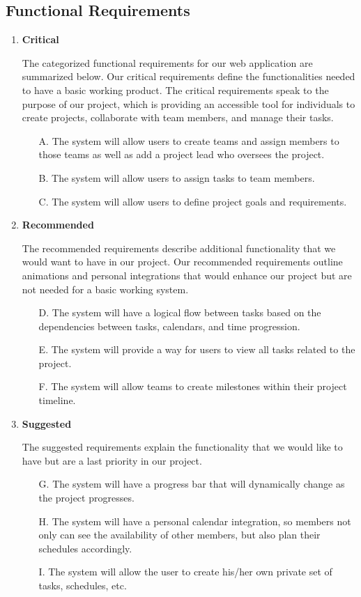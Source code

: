 \pagebreak

\subsection{Functional Requirements}
\begin{enumerate}
\item \textbf{Critical}
\par The categorized functional requirements for our web application are summarized below. Our critical requirements define the functionalities needed to have a basic working product. The critical requirements speak to the purpose of our project, which is providing an accessible tool for individuals to create projects, collaborate with team members, and manage their tasks.
	\begin{enumerate}
	\item[A.] The system will allow users to create teams and assign members to those teams as well as add a project lead who oversees the project. 
	\item[B.] The system will allow users to assign tasks to team members.
	\item[C.] The system will allow users to define project goals and requirements.

	\end{enumerate}
\item \textbf{Recommended}
\par The recommended requirements describe additional functionality that we would want to have in our project. Our recommended requirements outline animations and personal integrations that would enhance our project but are not needed for a basic working system. 
	\begin{enumerate}
	\item[D.] The system will have a logical flow between tasks based on the dependencies between tasks, calendars, and time progression. 
	\item[E.] The system will provide a way for users to view all tasks related to the project.
	\item[F.] The system will allow teams to create milestones within their project timeline.
	\end{enumerate}
\item \textbf{Suggested}
\par The suggested requirements explain the functionality that we would like to have but are a last priority in our project. 
	\begin{enumerate}
	\item[G.] The system will have a progress bar that will dynamically change as the project progresses.
	\item[H.] The system will have a personal calendar integration, so members not only can see the availability of other members, but also plan their schedules accordingly.
	\item[I.] The system will allow the user to create his/her own private set of tasks, schedules, etc.
	\end{enumerate}
\end{enumerate}
